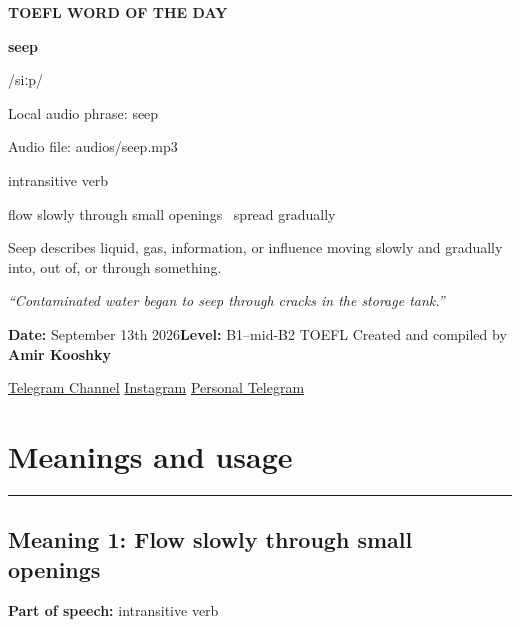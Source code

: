 \documentclass[11pt]{article}
\newcommand{\sectionrule}{\par\vspace{-0.5em}\noindent\textcolor{Accent}{\rule{\linewidth}{0.6pt}}\par}
\begin{document}
\begin{center}
{\sffamily\bfseries\color{Accent} TOEFL WORD OF THE DAY\par}
\vspace{8mm}
{\fontsize{42}{48}\selectfont\bfseries seep\par}
\vspace{2mm}
{\Large\sffamily\color{Accent} /siːp/\par}
\vspace{2mm}
{\small\sffamily Local audio phrase: seep\par}
{\small\sffamily Audio file: audios/seep.mp3\par}
\vspace{2mm}
{\large\sffamily\color{Muted} intransitive verb\par}
\vspace{5mm}
{\sffamily flow slowly through small openings \textbullet\ spread gradually\par}
\vspace{6mm}
{\large Seep describes liquid, gas, information, or influence moving slowly and gradually into, out of, or through something.\par}
\vspace{6mm}
\begin{minipage}{0.84\textwidth}
\itshape “Contaminated water began to seep through cracks in the storage tank.”
\end{minipage}\par
\vspace{10mm}
\textbf{Date:} September 13th 2026\quad\textbullet\quad \textbf{Level:} B1--mid-B2 TOEFL
\vfill
Created and compiled by \textbf{Amir Kooshky}\par
\vspace{2mm}
\href{https://t.me/KooshkyTOEFL}{Telegram Channel}\quad\textbullet\quad
\href{https://www.instagram.com/kooshkytoefl}{Instagram}\quad\textbullet\quad
\href{https://t.me/KooshkyTOEFL\_pv}{Personal Telegram}
\end{center}
\newpage
\tableofcontents
\newpage

\section{Meanings and usage}
\sectionrule
\subsection{Meaning 1: Flow slowly through small openings}
\textbf{Part of speech:} intransitive verb
\end{document}
